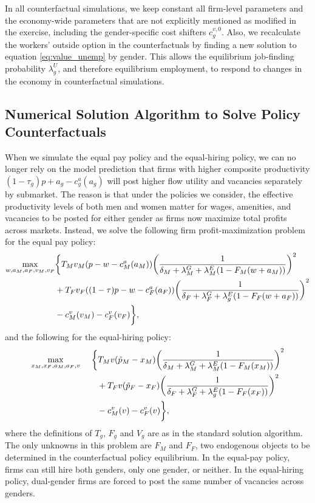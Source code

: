 In all counterfactual simulations, we keep constant all firm-level parameters and the economy-wide parameters that are not explicitly mentioned as modified in the exercise, including the gender-specific cost shifters $c_{g}^{v,0}$. Also, we recalculate the workers' outside option in the counterfactuals by finding a new solution to equation \eqref{eq:value_unemp} by gender. This allows the equilibrium job-finding probability $\lambda_{g}^U$, and therefore equilibrium employment, to respond to changes in the economy in counterfactual simulations.


\subsection{Numerical Solution Algorithm to Solve Policy Counterfactuals\label{app:policy_algorithms}}

When we simulate the equal pay policy and the equal-hiring policy, we can no longer rely on the model prediction that firms with higher composite productivity $(1 - \tau_g) p + a_g - c_g^{a}(a_g)$ will post higher flow utility and vacancies separately by submarket. The reason is that under the policies we consider, the effective productivity levels of both men and women matter for wages, amenities, and vacancies to be posted for either gender as firms now maximize total profits across markets. Instead, we solve the following firm profit-maximization problem for the equal pay policy:
%
\begin{align}
    \max_{w,a_{M},a_{F},v_{M},v_{F}} & \biggl{\{} T_{M} v_{M} (p - w - c_{M}^{a}(a_{M})) \biggl{(} \frac{1}{\delta_{M} + \lambda_{M}^{G} + \lambda_{M}^{E} (1 - F_{M}(w + a_{M}))} \biggr{)}^2  \\
    & + T_{F} v_{F} ((1 - \tau) p - w - c_{F}^{a}(a_{F})) \biggl{(} \frac{1}{\delta_{F} + \lambda_{F}^{G} + \lambda_{g}^{E} (1 - F_{F}(w + a_{F}))} \biggr{)}^{2} \\
    & - c_{M}^{v}(v_{M}) - c_{F}^{v}(v_{F}) \biggr{\} },
\end{align}
%
and the following for the equal-hiring policy:
%
\begin{align}
    \max_{x_{M},x_{F},a_{M},a_{F},v} & \phantom{{}={}} \biggl{\{} T_{M} v (\tilde{p}_{M} - x_{M}) \biggl{(} \frac{1}{\delta_{M} + \lambda_{M}^{G} + \lambda_{M}^{E} (1 - F_{M}(x_{M}))} \biggr{)}^2  \\
    & \qquad + T_{F} v (\tilde{p}_{F} - x_{F}) \biggl{(} \frac{1}{\delta_{F} + \lambda_{F}^{G} + \lambda_{g}^{E} (1 - F_{F}(x_{F}))} \biggr{)}^{2} \\
    & \qquad - c_{M}^{v}(v) - c_{F}^{v}(v) \biggr{\} },
\end{align}
%
where the definitions of $T_g$, $F_g$ and $V_g$ are as in the standard solution algorithm. The only unknowns in this problem are $F_{M}$ and $F_{F}$, two endogenous objects to be determined in the counterfactual policy equilibrium. In the equal-pay policy, firms can still hire both genders, only one gender, or neither. In the equal-hiring policy, dual-gender firms are forced to post the same number of vacancies across genders.

